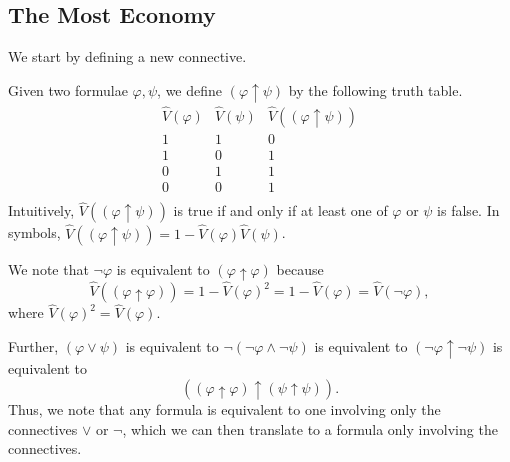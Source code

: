 \subsection{The Most Economy}
We start by defining a new connective.
\begin{definition}
	Given two formulae $\varphi,\psi$, we define $(\varphi\uparrow\psi)$ by the following truth table.
	\[\begin{array}{c|c||c}
		\hat V(\varphi) & \hat V(\psi) & \hat V((\varphi\uparrow\psi)) \\
		\hline
		1 & 1 & 0 \\
		1 & 0 & 1 \\
		0 & 1 & 1 \\
		0 & 0 & 1 \\
	\end{array}\]
	Intuitively, $\hat V((\varphi\uparrow\psi))$ is true if and only if at least one of $\varphi$ or $\psi$ is false. In symbols, $\hat V((\varphi\uparrow\psi))=1-\hat V(\varphi)\hat V(\psi)$.
\end{definition}
We note that $\lnot\varphi$ is equivalent to $(\varphi\uparrow\varphi)$ because
\[\hat V((\varphi\uparrow\varphi))=1-\hat V(\varphi)^2=1-\hat V(\varphi)=\hat V(\lnot\varphi),\]
where $\hat V(\varphi)^2=\hat V(\varphi)$.

Further, $(\varphi\lor\psi)$ is equivalent to $\lnot(\lnot\varphi\land\lnot\psi)$ is equivalent to $(\lnot\varphi\uparrow\lnot\psi)$ is equivalent to
\[((\varphi\uparrow\varphi)\uparrow(\psi\uparrow\psi)).\]
Thus, we note that any formula is equivalent to one involving only the connectives $\lor$ or $\lnot$, which we can then translate to a formula only involving the connectives.

